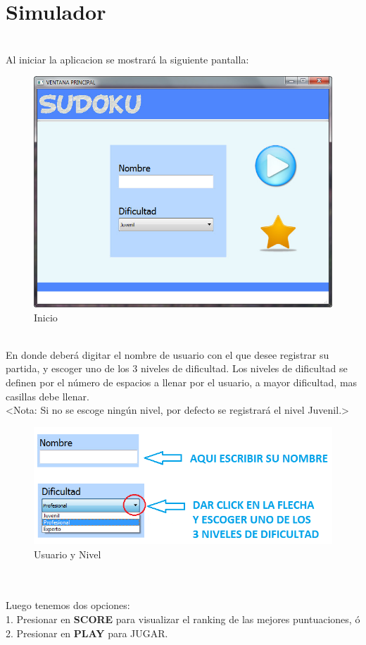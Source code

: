 \section{Simulador}
\ \\ Al iniciar la aplicacion se mostrará la siguiente pantalla:

\begin{figure}[htbp]
\begin{center}
\includegraphics[width=.70\textwidth]{./imagenes/Inicio1.png}
\caption{Inicio}
\label{Inicio}
\end{center}
\end{figure}

\ \\ En donde deberá digitar el nombre de usuario con el que desee registrar su partida, y escoger uno de los 3 niveles de dificultad.
Los niveles de dificultad se definen por el n\'umero de espacios a llenar por el usuario, a mayor dificultad, mas casillas debe llenar.
 \\ <Nota: Si no se escoge ningún nivel, por defecto se registrará el nivel Juvenil.>

\begin{figure}[htbp]
\begin{center}
\includegraphics[width=.60\textwidth]{./imagenes/Inicio4.png}
\caption{Usuario y Nivel}
\label{Usuario y Nivel}
\end{center}
\end{figure}

\ \\ \ \\ 
Luego tenemos dos opciones: \\ 1. Presionar en \textbf{SCORE} para visualizar el ranking de las mejores puntuaciones, ó \\ 2. Presionar en \textbf{PLAY} para JUGAR. 


